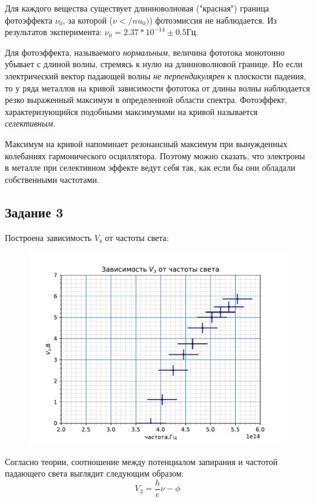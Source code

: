 Для каждого вещества существует длинноволновая ("красная") граница фотоэффекта $\nu_0$, за которой ($\nu < /nu_0)$) фотоэмиссия не наблюдается. Из результатов эксперимента: $\nu_0=2.37*10^{-14}\pm 0.5 \text{Гц}$.

Для фотоэффекта, называемого {\itshape{нормальным}}, величина фототока монотонно убывает с длиной волны, стремясь к нулю на длинноволновой границе. Но если электрический вектор падающей волны {\itshape{не перпендикулярен}} к плоскости падения, то у ряда металлов на кривой зависимости фототока от длины волны наблюдается резко выраженный максимум в определенной области спектра. Фотоэффект, характеризующийся подобными максимумами на кривой называется {\itshape{селективным}}. 

Максимум на кривой напоминает резонансный максимум при вынужденных колебаниях гармонического осциллятора. Поэтому можно сказать, что электроны в металле при селективном эффекте ведут себя так, как если бы они обладали собственными частотами.

\subsection{Задание 3}
Построена зависимость $V_з$ от частоты света:
\begin{figure}[H]
	\centering
	\includegraphics[scale=1]{scripts/z3.pdf}
	\caption{}
	\label{fig:13}
\end{figure}
Согласно теории, соотношение между потенциалом запирания и частотой падающего света выглядит следующим образом: $$V_{3}=\frac he \nu-\phi$$


